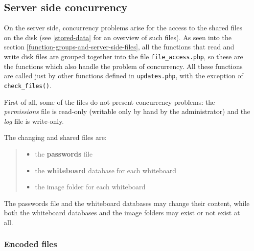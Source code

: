 \documentclass[10pt,a4paper,english]{book}
\begin{document}

\hypertarget{server-side-concurrency}{}
\subsection{Server side concurrency}
\label{server-side-concurrency}

On the server side, concurrency problems arise for the access to the
shared files on the disk (see \href{\#stored-data}{\ref*{stored-data}} for an overview of such
files). As seen into the section \href{\#function-groups-and-server-side-files}{\ref*{function-groups-and-server-side-files}}, all the functions that read and write disk files are grouped
together into the file \texttt{file{\_}access.php}, so these are the functions
which also handle the problem of concurrency\footnotemark[3]. All
these functions are called just by other functions defined in
\texttt{updates.php}, with the exception of \texttt{check{\_}files()}.

First of all, some of the files do not present concurrency problems:
the \emph{permissions} file is read-only (writable only by hand by the
administrator) and the \emph{log} file is write-only.

The changing and shared files are:
\begin{quote}
\begin{itemize}
\item {} 
the \textbf{passwords} file

\item {} 
the \textbf{whiteboard} database for each whiteboard

\item {} 
the image folder for each whiteboard

\end{itemize}
\end{quote}

The passwords file and the whiteboard databases may change
their content, while both the whiteboard databases and the image
folders may exist or not exist at all.



\hypertarget{encoded-files}{}
\subsubsection{Encoded files}
\label{encoded-files}
\end{document}
